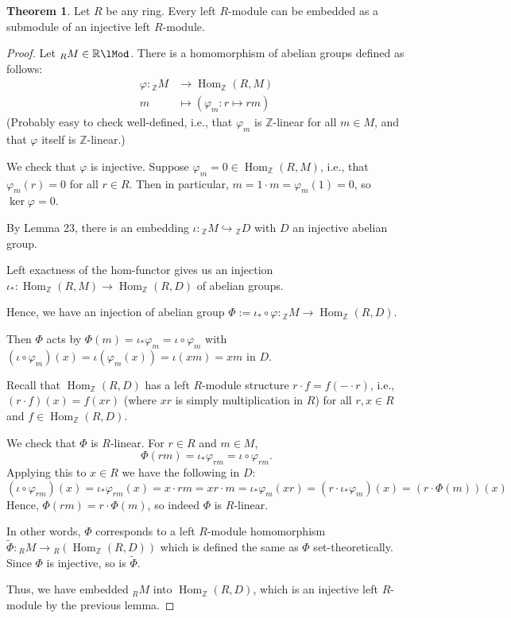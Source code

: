 \documentclass[12pt]{article}
\theoremstyle{definition}
\newtheorem{theorem}{Theorem}
\newcommand{\Z}{\mathbb{Z}}
\newcommand{\R}{\mathbb{R}}
\renewcommand{\phi}{\varphi}
\newcommand{\<}{\left\langle}
\renewcommand{\>}{\right\rangle}
\newcommand{\inc}{\hookrightarrow}
\newcommand{\To}{\longrightarrow}
\newcommand{\Mapsto}{\longmapsto}
\DeclareMathOperator{\Hom}{Hom}
\renewcommand{\_}[1]{{_{#1}}}
\begin{document}
\begin{theorem}
    Let $R$ be any ring.
    Every left $R$-module can be embedded as a submodule of an injective left $R$-module.
\end{theorem}

\begin{proof}
    Let $\_RM \in \R\lMod$.
    There is a homomorphism of abelian groups defined as follows:
    \begin{align*}
        \phi : \_{\Z}M &\To \Hom_\Z(R, M) \\
            m &\Mapsto (\phi_m : r \mapsto rm)
    \end{align*}
    (Probably easy to check well-defined, i.e., that $\phi_m$ is $\Z$-linear for all $m \in M$, and that $\phi$ itself is $\Z$-linear.)

    We check that $\phi$ is injective.
    Suppose $\phi_m = 0 \in \Hom_\Z(R, M)$, i.e., that $\phi_m(r) = 0$ for all $r \in R$.
    Then in particular, $m = 1 \cdot m = \phi_m(1) = 0$, so $\ker \phi = 0$.

    By Lemma 23, there is an embedding $\iota : \_{\Z}M \inc \_{\Z}D$ with $D$ an injective abelian group.

    Left exactness of the hom-functor gives us an injection $\iota_* : \Hom_\Z(R, M) \to \Hom_\Z(R, D)$ of abelian groups.

    Hence, we have an injection of abelian group $\Phi := \iota_* \circ \phi : \_{\Z}M \to \Hom_\Z(R, D)$.

    Then $\Phi$ acts by $\Phi(m) = \iota_*\phi_m = \iota \circ \phi_m$ with $(\iota \circ \phi_m)(x) = \iota(\phi_m(x)) = \iota(xm) = xm$ in $D$.

    Recall that $\Hom_\Z(R, D)$ has a left $R$-module structure $r \cdot f = f(- \cdot r)$, i.e., $(r \cdot f)(x) = f(xr)$ (where $xr$ is simply multiplication in $R$) for all $r, x \in R$ and $f \in \Hom_\Z(R, D)$.

    We check that $\Phi$ is $R$-linear.
    For $r \in R$ and $m \in M$,
    \[
        \Phi(rm)
            = \iota_*\phi_{rm}
            = \iota \circ \phi_{rm}.
    \]
    Applying this to $x \in R$ we have the following in $D$:
    \[
        (\iota \circ \phi_{rm})(x)
            = \iota_*\phi_{rm}(x)
            = x \cdot rm
            = xr \cdot m
            = \iota_*\phi_m(xr)
            = (r \cdot \iota_*\phi_m)(x)
            = (r \cdot \Phi(m))(x)
    \]
    Hence, $\Phi(rm) = r \cdot \Phi(m)$, so indeed $\Phi$ is $R$-linear.

    In other words, $\Phi$ corresponds to a left $R$-module homomorphism $\tilde{\Phi} : \_RM \to \_R(\Hom_\Z(R, D))$ which is defined the same as $\Phi$ set-theoretically.
    Since $\Phi$ is injective, so is $\tilde{\Phi}$.

    Thus, we have embedded $\_RM$ into $\Hom_\Z(R, D)$, which is an injective left $R$-module by the previous lemma.
\end{proof}
\end{document}
